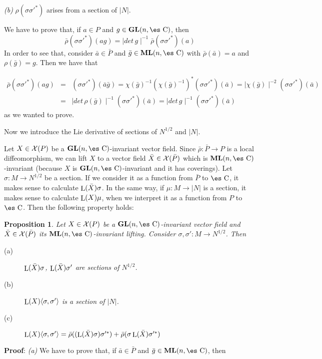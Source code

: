 \documentclass[12pt]{article}
\theoremstyle{plain}
\newtheorem{prop}{Proposition}
\def\beann{\begin{eqnarray*}}
\def\eeann{\end{eqnarray*}}
\def\qed{\ifvmode\removelastskip\fi
{\unskip\nobreak\hfil\penalty50\hbox{}\nobreak\hfil
\hbox{\vrule height1.2ex width1.2ex}\parfillskip=0pt
\finalhyphendemerits=0 \par\smallskip}}
\def\GL{{\bf GL}(n,\Complex )}
\def\ML{{\bf ML}(n,\Complex )}
\def\Complex{\mbox{\es C}}
\def\Lie{\mathop{\rm L}\nolimits}
\begin{document}
\quad \quad
{\it (b)} \quad
$\rho (\sigma \sigma '^*)$ arises from a section of $| N |$.

We have to prove that, if $a \in P$ and $g \in \GL$, then
$$
\bar \rho (\sigma \sigma '^*)(ag) =
\mid det\, g \mid^{-1} \bar \rho (\sigma \sigma '^*)(a)
$$
In order to see that, consider $\bar a \in \bar P$ and $\bar g \in \ML$
with $\bar \rho (\bar a) = a$ and $\rho (\bar g) = g$. Then we have that

\beann
\bar \rho (\sigma \sigma '^*)(ag)
& = &
(\sigma \sigma '^*)(\bar a \bar g) =
\chi (\bar g)^{-1} (\chi (\bar g)^{-1})^*
(\sigma \sigma '^*)(\bar a) =
\mid \chi (\bar g) \mid ^{-2} (\sigma \sigma '^*)(\bar a)
\\
& = &
\mid det\, \rho (\bar g) \mid ^{-1} (\sigma \sigma '^*)(\bar a) =
\mid det\, g \mid ^{-1} (\sigma \sigma '^*)(\bar a)
\eeann
as we wanted to prove.
\qed

Now we introduce the Lie derivative of sections of $N^{1/2}$ and $| N
|$.

Let $X \in {\cal X}(P)$ be a $\GL$-invariant vector field. Since
$\bar \rho : \bar P \to P$ is a local diffeomorphism, we can lift
$X$ to a vector field $\bar X \in {\cal X}(\bar P)$ which is
$\ML$-invariant (because $X$ is $\GL$-invariant and it has
coverings). Let $\sigma : M \to N^{1/2}$ be a section. If we
consider it as a function from $\bar P$ to $\Complex$, it makes
sense to calculate $\Lie(\bar X) \sigma$. In the same way, if $\mu
: M \to | N |$ is a section, it makes sense to calculate $\Lie(X)
\mu$, when we interpret it as a function from $P$ to $\Complex$.
Then the following property holds:

\begin{prop}
Let $X \in {\cal X}(P)$ be a $\GL$-invariant vector field
and $\bar X \in {\cal X}(\bar P)$ its $\ML$-invariant lifting.
Consider $\sigma , \sigma ' : M \to N^{1/2}$. Then
\begin{description}
\item[{\rm (a)}]
$\Lie(\bar X) \sigma$, $\Lie(\bar X) \sigma '$
are sections of $N^{1/2}$.
\item[{\rm (b)}]
$\Lie(X) \langle \sigma ,\sigma ' \rangle$
is a section of $| N |$.
\item[{\rm (c)}]
$\Lie(X) \langle \sigma ,\sigma ' \rangle =
\bar \rho ((\Lie(\bar X)  \sigma )\sigma '^*) +
\bar \rho (\sigma \Lie(\bar X) \sigma '^*)$
\end{description}
\label{propi2}
\end{prop}
{\bf Proof}: 
{\it (a)} \quad
We have to prove that, if $\bar a \in \bar P$ and $\bar g \in \ML$, then
\end{document}
